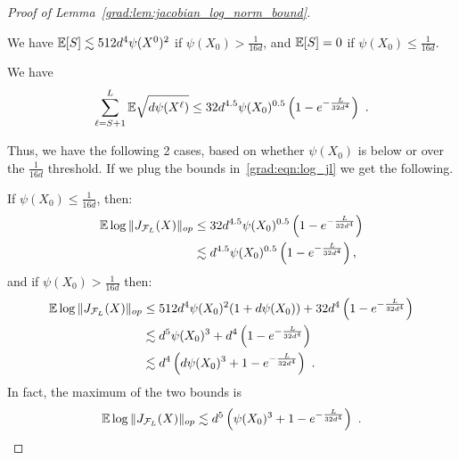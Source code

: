 \begin{proof}[Proof of Lemma~\ref{grad:lem:jacobian_log_norm_bound}]
\begin{lemma}
\label{grad:lem:hitting_layer}
    We have $\mathbb{E} [S] \lesssim 512 d^4\psi(X^0)^2$ if $\psi(X_0) > \frac{1}{16d}$, and $\mathbb{E}[S] = 0$ if $\psi(X_0) \leq \frac{1}{16d}$. 
\end{lemma}



\begin{lemma}
\label{grad:lem:second_phase_jac}
    We have $$\sum_{\ell=S+1}^L \mathbb{E} \sqrt{d\psi(X^\ell)} \le 32 d^{4.5} \psi(X_0)^{0.5} \left(1 - e^{-\frac{L}{32 d^4}}\right)~.$$
\end{lemma}


Thus, we have the following 2 cases, based on whether $\psi(X_0)$ is below or over the $\frac{1}{16d}$ threshold. If we plug the bounds in~\eqref{grad:eqn:log_jl} we get the following. 

If $\psi(X_0)\le \frac{1}{16d}$, then:
\begin{align}
    \mathbb{E} \log\|J_{\mathcal{F}_L}(X)\|_{op} &\le 32 d^{4.5} \psi(X_0)^{0.5} \left(1 - e^{-\frac{L}{32 d^4}}\right) \\
    &\lesssim d^{4.5}\psi(X_0)^{0.5} \left(1- e^{-\frac{L}{32 d^4}}\right),
\end{align}
and if $\psi(X_0) > \frac{1}{16d}$ then:
\begin{align}
    \mathbb{E} \log\|J_{\mathcal{F}_L}(X)\|_{op} &\le 512 d^4 \psi(X_0)^2  (1 + d\psi(X_0))+ 32 d^{4} \left(1- e^{-\frac{L}{32 d^4}}\right)\\
    &\lesssim d^5 \psi(X_0)^3 + d^4 \left(1-e^{-\frac{L}{32d^4}}\right)\\
    &\lesssim d^4 \left(d\psi(X_0)^3 + 1- e^{-\frac{L}{32 d^4}}\right)~.
\end{align}
In fact, the maximum of the two bounds is
\begin{align}
    \mathbb{E} \log\|J_{\mathcal{F}_L}(X)\|_{op}\lesssim d^5 \left(\psi(X_0)^3 + 1-e^{-\frac{L}{32d^4}}\right)~.
\end{align}
\end{proof}
